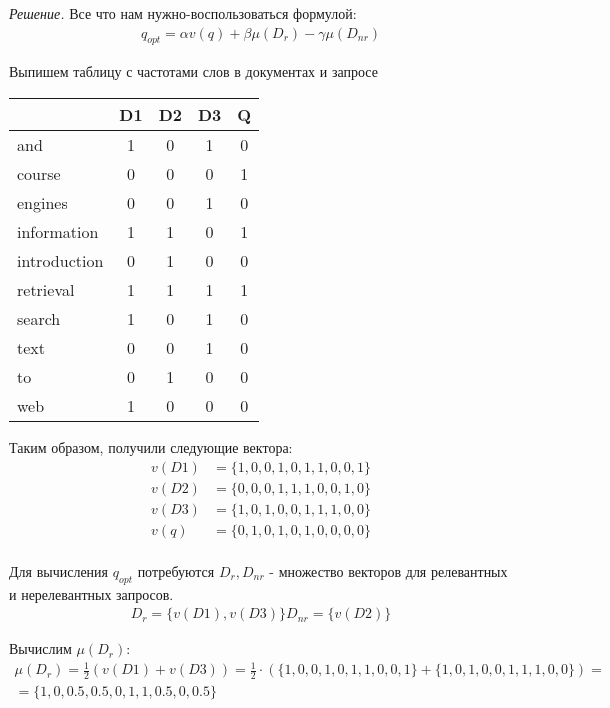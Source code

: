 \begin{enumerate}
	\textit{Решение. } Все что нам нужно-воспользоваться формулой:
	\begin{align*}
		q_{opt} = \alpha v(q) + \beta \mu(D_r) - \gamma \mu(D_{nr})
	\end{align*}
	
	Выпишем таблицу с частотами слов в документах и запросе
	
	\begin{tabular}{l | c c c | c}
						& \textbf{D1} & D2 & \textbf{D3} & Q \\ \hline
		and 			& 1 & 0 & 1 & 0 \\
		course 			& 0 & 0 & 0 & 1 \\
		engines		 	& 0 & 0 & 1 & 0\\
		information		& 1 & 1 & 0 & 1 \\
		introduction 	& 0 & 1 & 0 & 0\\\hline
		retrieval 		& 1 & 1 & 1 & 1 \\
		search 			& 1 & 0 & 1 & 0 \\
		text 			& 0 & 0 & 1 & 0\\ 
		to			 	& 0 & 1 & 0 & 0\\
		web 			& 1 & 0 & 0 & 0 \\
	\end{tabular}
	
	Таким образом, получили следующие вектора:
	\begin{align*}
		v(D1) &= \{1, 0, 0, 1, 0, 1, 1, 0, 0, 1\} \\
		v(D2) &= \{0, 0, 0, 1, 1, 1, 0, 0, 1, 0\} \\
		v(D3) &= \{1, 0, 1, 0, 0, 1, 1, 1, 0, 0\} \\
		v(q) &= \{0, 1, 0, 1, 0, 1, 0, 0, 0, 0\} \\
	\end{align*}
	
	Для вычисления $q_{opt}$ потребуются $D_{r}, D_{nr}$ - множество векторов для релевантных и 
	нерелевантных запросов.
	\begin{align*}
		D_r = \{v(D1), v(D3)\}
		D_{nr} = \{v(D2)\}
	\end{align*}
	
	Вычислим $\mu(D_r)$:
	\begin{align*}
		\mu(D_r) = \frac{1}{2} (v(D1) + v(D3)) = \frac{1}{2}\cdot (\{1, 0, 0, 1, 0, 1, 1, 0, 
		0, 1\} + \{1, 0, 1, 0, 0, 1, 1, 1, 0, 0\}) = \\
		= \{1, 0, 0.5, 0.5, 0, 1, 1, 0.5, 0, 0.5\}
	\end{align*}
	

\end{enumerate}
